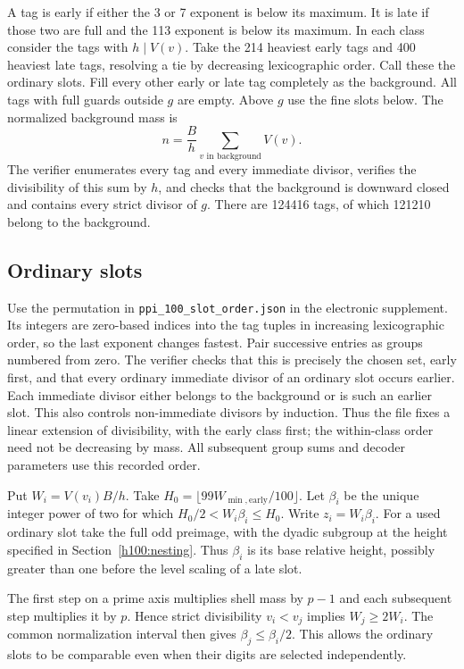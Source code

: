 A tag is early if either the 3 or 7 exponent is below its maximum. It is late if those two are full and the 113 exponent is below its maximum. In each class consider the tags with \(h\mid V(v)\). Take the 214 heaviest early tags and 400 heaviest late tags, resolving a tie by decreasing lexicographic order. Call these the ordinary slots. Fill every other early or late tag completely as the background. All tags with full guards outside \(g\) are empty. Above \(g\) use the fine slots below. The normalized background mass is \[
 n=\frac Bh\sum_{v\text{ in background}} V(v).
\] The verifier enumerates every tag and every immediate divisor, verifies the divisibility of this sum by \(h\), and checks that the background is downward closed and contains every strict divisor of \(g\). There are 124416 tags, of which 121210 belong to the background.

\subsection{Ordinary slots}\label{ordinary-slots}

Use the permutation in \texttt{ppi\_100\_slot\_order.json} in the electronic supplement. Its integers are zero-based indices into the tag tuples in increasing lexicographic order, so the last exponent changes fastest. Pair successive entries as groups numbered from zero. The verifier checks that this is precisely the chosen set, early first, and that every ordinary immediate divisor of an ordinary slot occurs earlier. Each immediate divisor either belongs to the background or is such an earlier slot. This also controls non-immediate divisors by induction. Thus the file fixes a linear extension of divisibility, with the early class first; the within-class order need not be decreasing by mass. All subsequent group sums and decoder parameters use this recorded order.

Put \(W_i=V(v_i)B/h\). Take \(H_0=\lfloor 99 W_{\min,\mathrm{early}}/100\rfloor\). Let \(\beta_i\) be the unique integer power of two for which \(H_0/2<W_i\beta_i\le H_0\). Write \(z_i=W_i\beta_i\). For a used ordinary slot take the full odd preimage, with the dyadic subgroup at the height specified in Section~\ref{h100:nesting}. Thus \(\beta_i\) is its base relative height, possibly greater than one before the level scaling of a late slot.

The first step on a prime axis multiplies shell mass by \(p-1\) and each subsequent step multiplies it by \(p\). Hence strict divisibility \(v_i<v_j\) implies \(W_j\ge 2W_i\). The common normalization interval then gives \(\beta_j\le\beta_i/2\). This allows the ordinary slots to be comparable even when their digits are selected independently.

